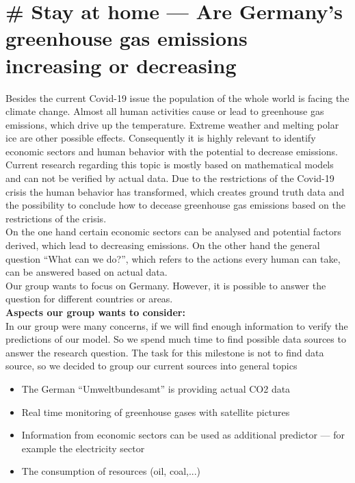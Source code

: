\documentclass[a4paper,DIV=calc,11pt]{scrartcl}
\begin{document}
\section*{\# Stay at home --- Are Germany's greenhouse gas emissions increasing or decreasing}

Besides the current Covid-19 issue the population of the whole world is facing the climate change. Almost all human activities cause or lead to greenhouse gas emissions, which drive up the temperature. Extreme weather and melting polar ice are other possible effects. Consequently it is highly relevant to identify economic sectors and human behavior with the potential to decrease emissions.\\

Current research regarding this topic is mostly based on mathematical models and can not be verified by actual data. Due to the restrictions of the Covid-19 crisis the human behavior has transformed, which creates ground truth data and the possibility to conclude how to decease greenhouse gas emissions based on the restrictions of the crisis.\\ On the one hand certain economic sectors can be analysed and potential factors derived, which lead to decreasing emissions. On the other hand the general question \enquote{What can we do?}, which refers to the actions every human can take, can be answered based on actual data.\\

Our group wants to focus on Germany. However, it is possible to answer the question for different countries or areas.\\


\textbf{Aspects our group wants to consider:}\\
In our group were many concerns, if we will find enough information to verify the predictions of our model. So we spend much time to find possible data sources to answer the research question. The task for this milestone is not to find data source, so we decided to group our current sources into general topics

\begin{itemize}
    \item The German \enquote{Umweltbundesamt} is providing actual CO2 data
    \item Real time monitoring of greenhouse gases with satellite pictures
    \item Information from economic sectors can be used as additional predictor --- for example the electricity sector
    \item The consumption of resources (oil, coal,...)
\end{itemize}
\end{document}
